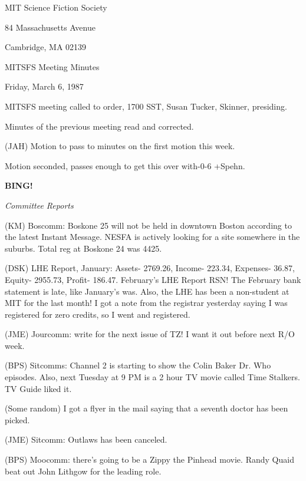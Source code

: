 \documentclass[12pt]{article}
\newcommand{\bing}{{\bf BING!} }
\newcommand{\goto}[1]{\bing \vskip 12pt \centerline{{\em{#1}}}}
\begin{document}
\begin{center}

MIT Science Fiction Society 

84 Massachusetts Avenue

Cambridge, MA 02139

\vspace{12pt}

MITSFS Meeting Minutes 

Friday, March 6, 1987

\end{center}
 
\vspace{18pt}

\setlength{\parskip}{6pt}

\noindent
MITSFS meeting called to order, 1700 SST,
Susan Tucker, Skinner, presiding.

Minutes of the previous meeting read and corrected.

(JAH) Motion to pass to minutes on the first motion this week.

Motion seconded, passes enough to get this over with-0-6 +Spehn.

\goto{Committee Reports}

(KM) Boscomm: Boskone 25 will not be held in downtown Boston according to the latest Instant Message. NESFA is actively looking for a site somewhere in the suburbs. Total reg at Boskone 24 was 4425.

(DSK) LHE Report, January: Assets- 2769.26, Income- 223.34, Expenses- 36.87, Equity- 2955.73, Profit- 186.47. February's LHE Report RSN! The February bank statement is late, like January's was. Also, the LHE has been a non-student at MIT for the last month! I got a note from the registrar yesterday saying I was registered for zero credits, so I went and registered.

(JME) Jourcomm: write for the next issue of TZ! I want it out before next R/O week.

(BPS) Sitcomms: Channel 2 is starting to show the Colin Baker Dr. Who episodes. Also, next Tuesday at 9 PM is a 2 hour TV movie called Time Stalkers. TV Guide liked it.

(Some random) I got a flyer in the mail saying that a seventh doctor has been picked.

(JME) Sitcomm: Outlaws has been canceled.

(BPS) Moocomm: there's going to be a Zippy the Pinhead movie. Randy Quaid beat out John Lithgow for the leading role.
\end{document}

